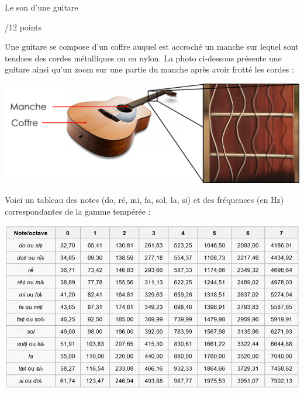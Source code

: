 \begin{doc}{Le son d’une guitare
 \begin{Large}
    /12 points
\end{Large}}
Une guitare se compose d'un coffre auquel est accroché un manche sur lequel sont tendues des cordes métalliques ou en nylon. La photo ci-dessous présente une guitare ainsi qu'un zoom sur une partie du manche après avoir frotté les cordes :

\begin{center}
    \includegraphics[scale=0.5]{Images/DS/Devoir_Commun/Guitare.png}
\end{center}

Voici un tableau des notes (do, ré, mi, fa, sol, la, si) et des fréquences (en Hz) correspondantes de la gamme tempérée :
\begin{center}
    \includegraphics[scale=0.7]{Images/DS/Devoir_Commun/Notes_guitare.png}
\end{center}


\end{doc}
